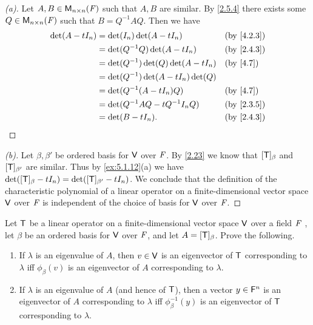 \begin{proof}[(a)]
	Let \(A, B \in \mathsf{M}_{{n} \times n}({\mathit{F}})\) such that \(A, B\) are similar.
	By \cref{2.5.4} there exists some \(Q \in \mathsf{M}_{{n} \times n}({\mathit{F}})\) such that \(B = Q^{-1} A Q\).
	Then we have
	\begin{align*}
		\det(A - t I_n) & = \det(I_n) \det(A - t I_n)            &  & \by{4.2.3} \\
		                & = \det(Q^{-1} Q) \det(A - t I_n)       &  & \by{2.4.3} \\
		                & = \det(Q^{-1}) \det(Q) \det(A - t I_n) &  & \by{4.7}   \\
		                & = \det(Q^{-1}) \det(A - t I_n) \det(Q)                 \\
		                & = \det(Q^{-1} (A - t I_n) Q)           &  & \by{4.7}   \\
		                & = \det(Q^{-1} A Q - t Q^{-1} I_n Q)    &  & \by{2.3.5} \\
		                & = \det(B - t I_n).                     &  & \by{2.4.3}
	\end{align*}
\end{proof}

\begin{proof}[(b)]
	Let \(\beta, \beta'\) be ordered basis for \(\mathsf{V}\) over \(\mathit{F}\).
	By \cref{2.23} we know that \([\mathsf{T}]_{\beta}\) and \([\mathsf{T}]_{\beta'}\) are similar.
	Thus by \cref{ex:5.1.12}(a) we have \(\det([\mathsf{T}]_{\beta} - t I_n) = \det([\mathsf{T}]_{\beta'} - t I_n)\).
	We conclude that the definition of the characteristic polynomial of a linear operator on a finite-dimensional vector space \(\mathsf{V}\) over \(\mathit{F}\) is independent of the choice of basis for \(\mathsf{V}\) over \(\mathit{F}\).
\end{proof}

\begin{ex}\label{ex:5.1.13}
	Let \(\mathsf{T}\) be a linear operator on a finite-dimensional vector space \(\mathsf{V}\) over a field \(\mathit{F}\) , let \(\beta\) be an ordered basis for \(\mathsf{V}\) over \(\mathit{F}\), and let \(A = [\mathsf{T}]_{\beta}\).
	Prove the following.
	\begin{enumerate}
		\item If \(\lambda\) is an eigenvalue of \(A\), then \(v \in \mathsf{V}\) is an eigenvector of \(\mathsf{T}\) corresponding to \(\lambda\) iff \(\phi_{\beta}(v)\) is an eigenvector of \(A\) corresponding to \(\lambda\).
		\item If \(\lambda\) is an eigenvalue of \(A\) (and hence of \(\mathsf{T}\)), then a vector \(y \in \mathsf{F}^n\) is an eigenvector of \(A\) corresponding to \(\lambda\) iff \(\phi_{\beta}^{-1}(y)\) is an eigenvector of \(\mathsf{T}\) corresponding to \(\lambda\).
	\end{enumerate}
\end{ex}

